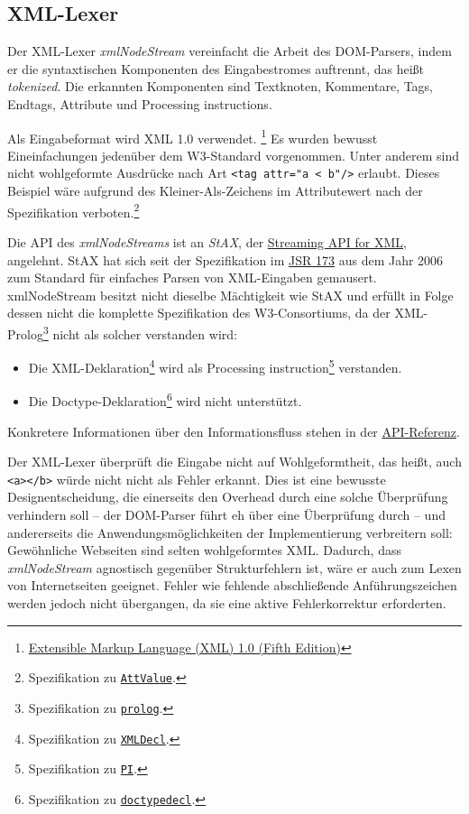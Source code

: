 \documentclass[10pt,a4paper,ngerman,titlepage,tocindentauto]{article}
\newcommand{\xmlNote}[2]{\footnote{Spezifikation zu \href{http://www.w3.org/TR/2008/REC-xml-20081126/\#{#1}}{\texttt{#2}}.}}
\begin{document}
		\subsection{XML-Lexer}
			Der XML-Lexer {\em xmlNodeStream} vereinfacht die Arbeit des DOM-Parsers, indem er die syntaxtischen
			Komponenten des Eingabestromes auftrennt, das heißt {\em tokenized}.
			Die erkannten Komponenten sind Textknoten, Kommentare, Tags, Endtags, Attribute und Processing instructions.
			
			Als Eingabeformat wird XML 1.0 verwendet.%
			\footnote{\href{http://www.w3.org/TR/2008/REC-xml-20081126/}{Extensible Markup Language (XML) 1.0 (Fifth Edition)}}
			Es wurden bewusst Eineinfachungen jedenüber dem W3-Standard vorgenommen. Unter anderem sind
			nicht wohlgeformte Ausdrücke nach Art \verb|<tag attr="a < b"/>| erlaubt.
			Dieses Beispiel wäre aufgrund des Kleiner-Als-Zeichens im Attributewert
			nach der Spezifikation verboten.\xmlNote{NT-AttValue}{AttValue}
			
			Die API des {\em xmlNodeStreams} ist an {\em StAX}, der \href{http://stax.codehaus.org/}{Streaming API for XML},
			angelehnt. StAX hat sich seit der Spezifikation im \href{http://jcp.org/en/jsr/detail?id=173}{JSR 173} aus
			dem Jahr 2006 zum Standard für einfaches Parsen von XML-Eingaben gemausert.
			xmlNodeStream besitzt nicht dieselbe Mächtigkeit wie StAX und erfüllt in Folge dessen
			nicht die komplette Spezifikation des W3-Consortiums, da der XML-Prolog\xmlNote{xmldoc}{prolog}
			nicht als solcher verstanden wird:
			\begin{itemize}
				\item
					Die XML-Deklaration\xmlNote{NT-XMLDecl}{XMLDecl} wird als
					Processing instruction\xmlNote{NT-PI}{PI} verstanden.
				\item
					Die Doctype-Deklaration\xmlNote{NT-doctypedecl}{doctypedecl} wird nicht unterstützt.
			\end{itemize}
			Konkretere Informationen über den Informationsfluss stehen in der \hyperlink{XML-Lexer-API}{API-Referenz}.
			
			Der XML-Lexer überprüft die Eingabe nicht auf Wohlgeformtheit, das heißt, auch
			\verb|<a></b>| würde nicht nicht als Fehler erkannt. Dies ist eine bewusste Designentscheidung,
			die einerseits den Overhead durch eine solche Überprüfung verhindern soll – der DOM-Parser
			führt eh über eine Überprüfung durch – und andererseits die Anwendungsmöglichkeiten der Implementierung
			verbreitern soll: Gewöhnliche Webseiten sind selten wohlgeformtes XML. Dadurch,
			dass {\em xmlNodeStream} agnostisch gegenüber Strukturfehlern ist, wäre er auch zum
			Lexen von Internetseiten geeignet. Fehler wie fehlende abschließende Anführungszeichen werden
			jedoch nicht übergangen, da sie eine aktive Fehlerkorrektur erforderten.
			
\end{document}

